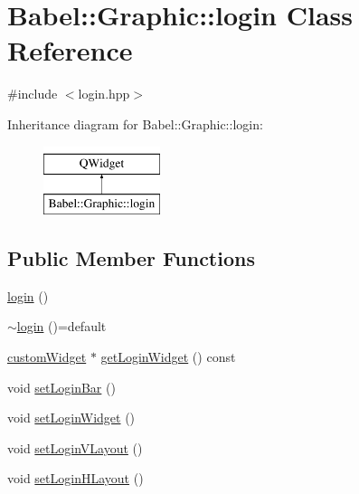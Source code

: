 \hypertarget{classBabel_1_1Graphic_1_1login}{}\section{Babel\+:\+:Graphic\+:\+:login Class Reference}
\label{classBabel_1_1Graphic_1_1login}


{\ttfamily \#include $<$login.\+hpp$>$}

Inheritance diagram for Babel\+:\+:Graphic\+:\+:login\+:\begin{figure}[H]
\begin{center}
\leavevmode
\includegraphics[height=2.000000cm]{classBabel_1_1Graphic_1_1login}
\end{center}
\end{figure}
\subsection*{Public Member Functions}
\begin{DoxyCompactItemize}
\item 
\hyperlink{classBabel_1_1Graphic_1_1login_ab2ea74a5e1e3e2aa38cd351b2fbec82c}{login} ()
\item 
\hyperlink{classBabel_1_1Graphic_1_1login_ae2eb7c20c6ed139244c1dd687ef0e93f}{$\sim$login} ()=default
\item 
\hyperlink{classBabel_1_1Graphic_1_1customWidget}{custom\+Widget} $\ast$ \hyperlink{classBabel_1_1Graphic_1_1login_adff76e5c19155c1cb912297330292515}{get\+Login\+Widget} () const
\item 
void \hyperlink{classBabel_1_1Graphic_1_1login_a19d786f54479e4fe5a11faa051c7612f}{set\+Login\+Bar} ()
\item 
void \hyperlink{classBabel_1_1Graphic_1_1login_a22aa089f18e279e745aee5dc80dc9d0d}{set\+Login\+Widget} ()
\item 
void \hyperlink{classBabel_1_1Graphic_1_1login_ad7d295d63b358153f325e3273afd328f}{set\+Login\+V\+Layout} ()
\item 
void \hyperlink{classBabel_1_1Graphic_1_1login_a1155b43ed9fcea53a3f85b221e495a75}{set\+Login\+H\+Layout} ()
\end{DoxyCompactItemize}
